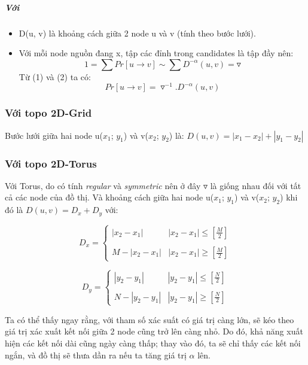 \documentclass[../report.tex]{subfiles}
\begin{document}
\subparagraph*{Với}
\begin{itemize}
    \item D(u, v) là khoảng cách giữa 2 node u và v (tính theo bước lưới).
    \item Với mỗi node nguồn đang x, tập các đỉnh trong candidates là tập đầy nên:
        \begin{equation}
            1 = \sum Pr[u \rightarrow v] \sim \sum D^{-\alpha}(u, v) = \triangledown
        \end{equation}
        Từ (1) và (2) ta có: 
            \begin{equation}
                Pr[u \rightarrow v] = \triangledown^{-1}.D^{-\alpha}(u, v)
            \end{equation}
\end{itemize}

\subsubsection*{Với topo 2D-Grid}
Bước lưới giữa hai node u($x_1$; $y_1$) và v($x_2$; $y_2$) là: $D(u, v) = |x_1 - x_2| + |y_1 - y_2|$
\subsubsection*{Với topo 2D-Torus}
Với Torus, do có tính \textit{regular} và \textit{symmetric} nên ở đây $\triangledown$ là giống nhau đối với tất cả các node của đồ thị. Và khoảng cách giữa hai node u($x_1$; $y_1$) và v($x_2$; $y_2$) khi đó là $D(u, v) = D_x + D_y$ với:

\par
\[
D_x =  
\left\{
\begin{array}{cc}
|x_2 - x_1|  & |x_2 - x_1| \le \left[\frac{M}{2}\right] \\ \\ 
M - |x_2 - x_1| & |x_2 - x_1| \ge \left[\frac{M}{2}\right]  
\end{array}
\right.
\]

\par
\[
D_y =  
\left\{
\begin{array}{cc}
|y_2 - y_1|  & |y_2 - y_1| \le \left[\frac{N}{2}\right] \\ \\
N - |y_2 - y_1| & |y_2 - y_1| \ge \left[\frac{N}{2}\right]  
\end{array}
\right.
\]

Ta có thể thấy ngay rằng, với tham số xác suất có giá trị càng lớn, sẽ kéo theo giá trị xác xuất kết nối giữa 2 node cũng trở lên càng nhỏ. Do đó, khả năng xuất hiện các kết nối dài cũng ngày càng thấp; thay vào đó, ta sẽ chỉ thấy các kết nối ngắn, và đồ thị sẽ thưa dần ra nếu ta tăng giá trị $\alpha$ lên.
\end{document}
